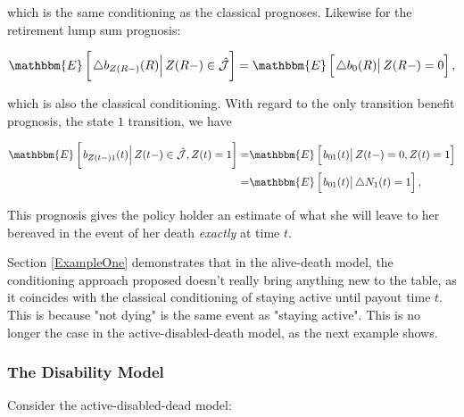 \documentclass{article}
\newcommand{\1}[1]{\mathbbm{1}_{\left\lbrace #1 \right\rbrace}}
\newcommand{\econd}[2][def]{\mathbbm{E} \left[ \left. #1 \right| #2 \right]}
\theoremstyle{break}
\theoremstyle{remark}
\numberwithin{equation}{section}
\begin{document}
which is the same conditioning as the classical prognoses. Likewise for the retirement lump sum prognosis:

\begin{align*}
    \econd[\triangle b_{Z(R-)}(R)]{Z(R-) \in \hat{\mathcal{J}}} = \econd[\triangle b_0(R)]{Z(R-) = 0},
\end{align*}

which is also the classical conditioning. With regard to the only transition benefit prognosis, the state $1$ transition, we have

\begin{align*}
\econd[b_{Z(t-)1}(t)]{Z(t-) \in \hat{\mathcal{J}}, Z(t)=1} =& \econd[b_{01}(t)]{Z(t-)=0, Z(t)=1} \\
=& \econd[b_{01}(t)]{\triangle N_1(t) = 1},
\end{align*}

This prognosis gives the policy holder an estimate of what she will leave to her bereaved in the event of her death \textit{exactly} at time $t$.

Section \ref{ExampleOne} demonstrates that in the alive-death model, the conditioning approach proposed doesn't really bring anything new to the table, as it coincides with the classical conditioning of staying active until payout time $t$. This is because "not dying" is the same event as "staying active". This is no longer the case in the active-disabled-death model, as the next example shows.

\subsubsection{The Disability Model} \label{DisModel}

Consider the active-disabled-dead model:
\end{document}
